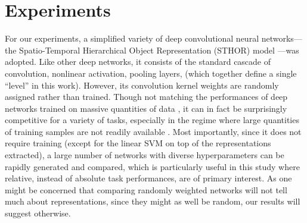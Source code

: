\documentclass[10pt,twocolumn,letterpaper]{article}
\begin{document}
\section{Experiments}
\label{sec:exp}

For our experiments, a simplified variety of deep convolutional neural networks---the Spatio-Temporal Hierarchical Object Representation (STHOR) model \cite{pinto2009high, sthor}---{was} adopted.
Like other deep networks, it consists of the standard cascade of convolution, nonlinear activation, pooling layers, \etc (which together define a single ``level'' in this work). However, its convolution kernel weights are  randomly assigned rather than trained.
Though not matching the performances of deep networks trained on massive quantities of data \cite{krizhevsky2012imagenet}, it can in fact be surprisingly competitive for a variety of tasks, especially in the regime where large quantities of training samples are not readily available \cite{pinto2009high, cox2011beyond, viglarge}.
Most importantly, since it does not require training (except for the linear SVM on top of the representations extracted), a large number of networks with diverse hyperparameters can be rapidly generated and compared, which is particularly useful in this study where relative, instead of absolute task performances, are of primary interest. 
As one might be concerned that comparing randomly weighted networks will not tell much about representations, since they might as well be random, our results will suggest otherwise.

\newcommand{\expsettings}{\Ie 32 channels of filters in the top level's convolution layers, a simple setting with reasonable performance.
Following the terminology in recent work, shallow and deep neurons corresponded to \texttt{pool1} and \texttt{pool2} layers respectively.
Stimulus dimensionalities of the shallow and deep neurons {were} $N=121$ and $441$ (\ie spatially overlapping $11\times11$ and $21\times21$ receptive fields). %
Other minor changes included: nonlinear activations all simplified to \emph{ReLU} \cite{krizhevsky2012imagenet} mode and normalizations all in subtractive mode.
Overall, the architectures were more similar to those in \cite{simonyan2014very}, except pooling operations can be \emph{average}, \emph{squared}, or \emph{max-like} in our case.
}
\end{document}
